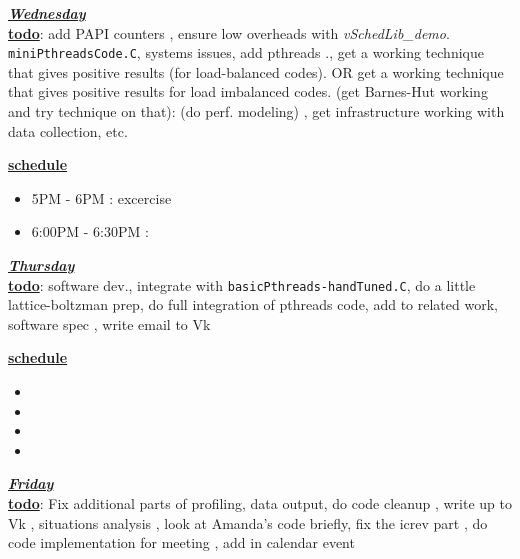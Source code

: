 \underline{\textbf{\textit{Wednesday}}}\\

\underline{\textbf{todo}}: add PAPI counters ,  ensure low overheads with \textit{vSchedLib\_demo}.
\texttt{miniPthreadsCode.C}, systems issues, add pthreads .,  get a working technique that gives positive results (for
load-balanced codes). OR get a working technique that gives positive
results for load imbalanced codes. (get Barnes-Hut
working and try technique on that): (do perf. modeling) , get infrastructure working with data collection, etc.

\underline{\textbf{schedule}}\\
\begin{itemize}
\item 5PM - 6PM : excercise
\item 6:00PM - 6:30PM :
\end{itemize}

\underline{\textbf{\textit{Thursday}}}\\
\underline{\textbf{todo}}: software dev., integrate with \texttt{basicPthreads-handTuned.C},
do a little lattice-boltzman prep,
 do full integration of pthreads code, add to related work,
software spec   , write email to Vk  

\underline{\textbf{schedule}}\\
\begin{itemize}
\item
\item
\item
\item
{}
\end{itemize}

\underline{\textbf{\textit{Friday}}}\\
\underline{\textbf{todo}}: Fix additional parts of profiling, data output, do code cleanup  ,
write up to Vk , situations analysis , look at Amanda's code briefly, fix the icrev part    ,
do code implementation for meeting , add in calendar event 

